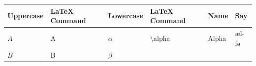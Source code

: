 \documentclass[
]{book}
\begin{document}
\begin{longtable}[]{@{}llllll@{}}
\toprule
\begin{minipage}[b]{0.18\columnwidth}\raggedright
Uppercase\strut
\end{minipage} & \begin{minipage}[b]{0.17\columnwidth}\raggedright
LaTeX Command\strut
\end{minipage} & \begin{minipage}[b]{0.18\columnwidth}\raggedright
Lowercase\strut
\end{minipage} & \begin{minipage}[b]{0.17\columnwidth}\raggedright
LaTeX Command\strut
\end{minipage} & \begin{minipage}[b]{0.06\columnwidth}\raggedright
Name\strut
\end{minipage} & \begin{minipage}[b]{0.08\columnwidth}\raggedright
Say\strut
\end{minipage}\tabularnewline
\midrule
\endhead
\begin{minipage}[t]{0.18\columnwidth}\raggedright
\(Α\)\strut
\end{minipage} & \begin{minipage}[t]{0.17\columnwidth}\raggedright
Α\strut
\end{minipage} & \begin{minipage}[t]{0.18\columnwidth}\raggedright
\(\alpha\)\strut
\end{minipage} & \begin{minipage}[t]{0.17\columnwidth}\raggedright
\textbackslash alpha\strut
\end{minipage} & \begin{minipage}[t]{0.06\columnwidth}\raggedright
Alpha\strut
\end{minipage} & \begin{minipage}[t]{0.08\columnwidth}\raggedright
æl-fə\strut
\end{minipage}\tabularnewline
\begin{minipage}[t]{0.18\columnwidth}\raggedright
\(Β\)\strut
\end{minipage} & \begin{minipage}[t]{0.17\columnwidth}\raggedright
Β\strut
\end{minipage} & \begin{minipage}[t]{0.18\columnwidth}\raggedright
\(\beta\)\strut
\end{minipage} & \begin{minipage}[t]{0.17\columnwidth}\raggedright

\end{minipage}
\end{longtable}
\end{document}
